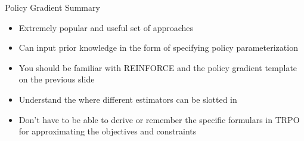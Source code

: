 \documentclass[aspectratio=169]{../latex_main/tntbeamer}  %
\begin{document}
\begin{frame}[c]{Policy Gradient Summary}

\begin{itemize}
    \item Extremely popular and useful set of approaches
    \item Can input prior knowledge in the form of specifying policy parameterization
    \item You should be familiar with REINFORCE and the policy gradient template on the previous slide
    \item Understand the where different estimators can be slotted in 
    \item Don't have to be able to derive or remember the specific formulars in TRPO for approximating the objectives and constraints
\end{itemize}

\end{frame}
\end{document}
